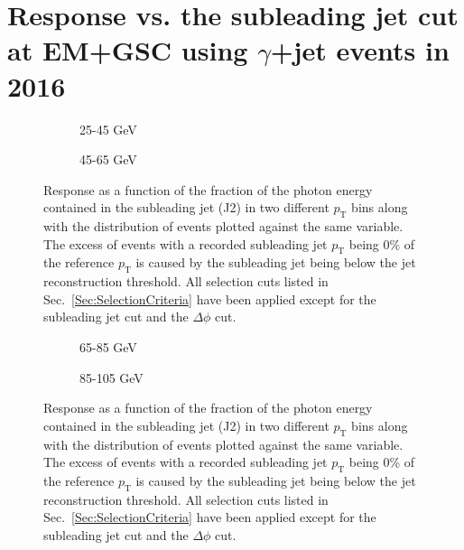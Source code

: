 \chapter{Response vs. the subleading jet cut at EM+GSC using $\gamma$+jet events in 2016}

\begin{figure}[!ht]
\centering
\begin{subfigure}{.5\textwidth}
\centering
{}
\caption{25-45 GeV}
\end{subfigure}%
\begin{subfigure}{.5\textwidth}
\centering
{}
\caption{45-65 GeV}
\end{subfigure}
  \caption[Response as a function of the subleading jet cut, 25-45 and 45-65 GeV bins]
  {\small Response as a function of the fraction of the photon energy contained in the subleading jet (J2) in two different $p_{\mathrm T}$ bins along with the distribution of events plotted against the same variable.  The excess of events with a recorded subleading jet $p_{\mathrm T}$ being 0\% of the reference $p_{\mathrm T}$ is caused by the subleading jet being below the jet reconstruction threshold.  All selection cuts listed in Sec.~\ref{Sec:SelectionCriteria} have been applied except for the subleading jet cut and the $\Delta\phi$ cut.  }
  \label{plot:GJetEMJ225-45_2016App}
\end{figure}

\begin{figure}[!ht]
  \centering
  \begin{subfigure}{.5\textwidth}
    \centering
    \caption{65-85 GeV}
  \end{subfigure}%
  \begin{subfigure}{.5\textwidth}
    \centering
    \caption{85-105 GeV}
  \end{subfigure}
  \caption[Response as a function of the subleading jet cut, 65-85 and 85-105 GeV bins]
  {\small Response as a function of the fraction of the photon energy contained in the subleading jet (J2) in two different $p_{\mathrm T}$ bins along with the distribution of events plotted against the same variable.  The excess of events with a recorded subleading jet $p_{\mathrm T}$ being 0\% of the reference $p_{\mathrm T}$ is caused by the subleading jet being below the jet reconstruction threshold.  All selection cuts listed in Sec.~\ref{Sec:SelectionCriteria} have been applied except for the subleading jet cut and the $\Delta\phi$ cut.  }
  \label{plot:GJetEMJ265-85_2016App}
\end{figure}

